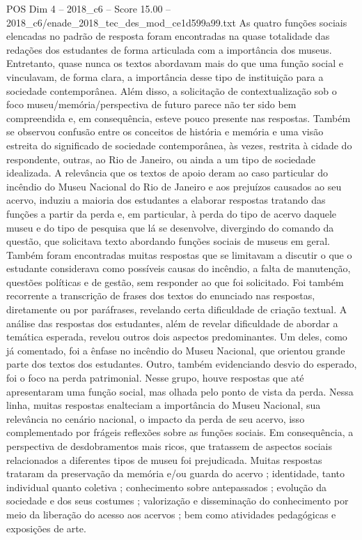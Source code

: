 \begin{textsample}{POS Dim 4 – 2018\_c6 – Score 15.00 – 2018\_c6/enade\_2018\_tec\_des\_mod\_ce1d599a99.txt}
As quatro funções sociais elencadas no padrão de resposta foram encontradas na quase totalidade das redações dos estudantes de forma articulada com a importância dos museus.
Entretanto, quase nunca os textos abordavam mais do que uma função social e vinculavam, de forma clara, a importância desse tipo de instituição para a sociedade contemporânea.
Além disso, a solicitação de contextualização sob o foco museu/memória/perspectiva de futuro parece não ter sido bem compreendida e, em consequência, esteve pouco presente nas respostas.
Também se observou confusão entre os conceitos de história e memória e uma visão estreita do significado de sociedade contemporânea, às vezes, restrita à cidade do respondente, outras, ao Rio de Janeiro, ou ainda a um tipo de sociedade idealizada.
A relevância que os textos de apoio deram ao caso particular do incêndio do Museu Nacional do Rio de Janeiro e aos prejuízos causados ao seu acervo, induziu a maioria dos estudantes a elaborar respostas tratando das funções a partir da perda e, em particular, à perda do tipo de acervo daquele museu e do tipo de pesquisa que lá se desenvolve, divergindo do comando da questão, que solicitava texto abordando funções sociais de museus em geral.
Também foram encontradas muitas respostas que se limitavam a discutir o que o estudante considerava como possíveis causas do incêndio, a falta de manutenção, questões políticas e de gestão, sem responder ao que foi solicitado.
Foi também recorrente a transcrição de frases dos textos do enunciado nas respostas, diretamente ou por paráfrases, revelando certa dificuldade de criação textual.
A análise das respostas dos estudantes, além de revelar dificuldade de abordar a temática esperada, revelou outros dois aspectos predominantes.
Um deles, como já comentado, foi a ênfase no incêndio do Museu Nacional, que orientou grande parte dos textos dos estudantes.
Outro, também evidenciando desvio do esperado, foi o foco na perda patrimonial.
Nesse grupo, houve respostas que até apresentaram uma função social, mas olhada pelo ponto de vista da perda.
Nessa linha, muitas respostas enalteciam a importância do Museu Nacional, sua relevância no cenário nacional, o impacto da perda de seu acervo, isso complementado por frágeis reflexões sobre as funções sociais.
Em consequência, a perspectiva de desdobramentos mais ricos, que tratassem de aspectos sociais relacionados a diferentes tipos de museu foi prejudicada.
Muitas respostas trataram da preservação da memória e/ou guarda do acervo ; identidade, tanto individual quanto coletiva ; conhecimento sobre antepassados ; evolução da sociedade e dos seus costumes ; valorização e disseminação do conhecimento por meio da liberação do acesso aos acervos ; bem como atividades pedagógicas e exposições de arte.

\end{textsample}
